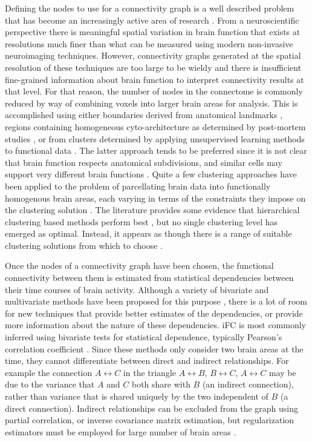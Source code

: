 \documentclass{bmcart}
\begin{document}
Defining the nodes to use for a connectivity graph is a well described problem that has become an increasingly active area of research \cite{Thirion2014}. From a neuroscientific perspective there is meaningful spatial variation in brain function that exists at resolutions much finer than what can be measured using modern non-invasive neuroimaging techniques. However, connectivity graphs generated at the spatial resolution of these techniques are too large to be wieldy and there is insufficient fine-grained information about brain function to interpret connectivity results at that level. For that reason, the number of nodes in the connectome is commonly reduced by way of combining voxels into larger brain areas for analysis. This is accomplished using either boundaries derived from anatomical landmarks \cite{Desikan2006,AAL2002}, regions containing homogeneous cyto-architecture as determined by post-mortem studies \cite{Eickhoff2008}, or from clusters determined by applying unsupervised learning methods to functional data \cite{Bellec2006,Craddock2012}. The latter approach tends to be preferred since it is not clear that brain function respects anatomical subdivisions, and similar cells may support very different brain functions \cite{Craddock2012}. Quite a few clustering approaches have been applied to the problem of parcellating brain data into functionally homogenous brain areas, each varying in terms of the constraints they impose on the clustering solution  \cite{Craddock2012,Blumensath2013,Bellec2006,Thirion2006,Zalesky2010,Flandin2002,Thirion2014}. The literature provides some evidence that hierarchical clustering based methods perform best \cite{Blumensath2013,Thirion2014}, but no single clustering level has emerged as optimal. Instead, it appears as though there is a range of suitable clustering solutions from which to choose  \cite{Craddock2012,Thirion2014}.  

Once the nodes of a connectivity graph have been chosen, the functional connectivity between them is estimated from statistical dependencies between their time courses of brain activity. Although a variety of bivariate and multivariate methods have been proposed for this purpose \cite{Smith2011,Varoquaux2013}, there is a lot of room for new techniques that provide better estimates of the dependencies, or provide more information about the nature of these dependencies. iFC is most commonly inferred using bivariate tests for statistical dependence, typically Pearson's correlation coefficient \cite{Biswal1995}. Since these methods only consider two brain areas at the time, they cannot differentiate between direct and indirect relationships. For example the connection $A \leftrightarrow C$ in the triangle $A \leftrightarrow B$, $B \leftrightarrow C$, $A \leftrightarrow C$ may be due to the variance that $A$ and $C$ both share with $B$ (an indirect connection), rather than variance that is shared uniquely by the two independent of $B$ (a direct connection). Indirect relationships can be excluded from the graph using partial correlation, or inverse covariance matrix estimation, but regularization estimators must be employed for large number of brain areas \cite{Ryali2012,Varoquaux2013}. 
\end{document}
